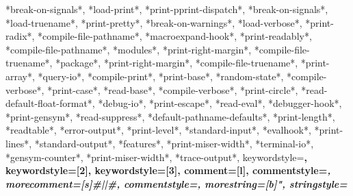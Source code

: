 {{        *break-on-signals*, *load-print*, *print-pprint-dispatch*, 
        *break-on-signals*, *load-truename*, *print-pretty*, 
        *break-on-warnings*, *load-verbose*, *print-radix*, 
        *compile-file-pathname*, *macroexpand-hook*, *print-readably*, 
        *compile-file-pathname*, *modules*, *print-right-margin*, 
        *compile-file-truename*, *package*, *print-right-margin*, 
        *compile-file-truename*, *print-array*, *query-io*, 
        *compile-print*, *print-base*, *random-state*, 
        *compile-verbose*, *print-case*, *read-base*, 
        *compile-verbose*, *print-circle*, *read-default-float-format*, 
        *debug-io*, *print-escape*, *read-eval*, 
        *debugger-hook*, *print-gensym*, *read-suppress*, 
        *default-pathname-defaults*, *print-length*, *readtable*, 
        *error-output*, *print-level*, *standard-input*, 
        *evalhook*, *print-lines*, *standard-output*, 
        *features*, *print-miser-width*, *terminal-io*, 
    *gensym-counter*, *print-miser-width*, *trace-output*},
    keywordstyle=\bfseries\color{lisp@func},%
    keywordstyle=[2]{\bfseries\color{lisp@key}},%
    keywordstyle=[3]{\bfseries\color{lisp@var}},%
    comment=[l]{\;}, %
    commentstyle=\it\small\color{lisp@comm},%
    morecomment=[s]{\#|}{|\#}, %
    commentstyle=\it\small\color{lisp@comm},%
    morestring=[b]",%
    stringstyle=\color{lisp@string}%
}

